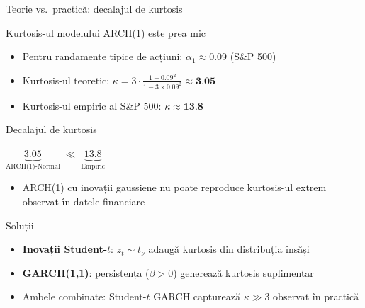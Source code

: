 \documentclass[9pt, aspectratio=169, t]{beamer}
\begin{document}
\begin{frame}{Teorie vs.\ practică: decalajul de kurtosis}
    \small
        \vspace{-0.3cm}
        \begin{block}{Kurtosis-ul modelului ARCH(1) este prea mic}
            \begin{itemize}
                \item Pentru randamente tipice de acțiuni: $\alpha_1 \approx 0.09$ (S\&P 500)
                \item Kurtosis-ul teoretic: $\kappa = 3 \cdot \frac{1 - 0.09^2}{1 - 3 \times 0.09^2} \approx \textbf{3.05}$
                \item Kurtosis-ul empiric al S\&P 500: $\kappa \approx \textbf{13.8}$
            \end{itemize}
        \end{block}
        \vspace{-0.15cm}
        \begin{alertblock}{Decalajul de kurtosis}
            \vspace{-2mm}
            \begin{center}
            {\large $\underbrace{3.05}_{\text{ARCH(1)-Normal}} \;\ll\; \underbrace{13.8}_{\text{Empiric}}$}
            \end{center}
            \vspace{-1mm}
            \begin{itemize}
                \item ARCH(1) cu inovații gaussiene nu poate reproduce kurtosis-ul extrem observat în datele financiare
            \end{itemize}
        \end{alertblock}
        \vspace{-0.15cm}
        \begin{exampleblock}{Soluții}
            \begin{itemize}
                \item \textbf{Inovații Student-$t$}: $z_t \sim t_\nu$ adaugă kurtosis din distribuția însăși
                \item \textbf{GARCH(1,1)}: persistența ($\beta > 0$) generează kurtosis suplimentar
                \item Ambele combinate: Student-$t$ GARCH capturează $\kappa \gg 3$ observat în practică
            \end{itemize}
        \end{exampleblock}
\end{frame}
\end{document}
